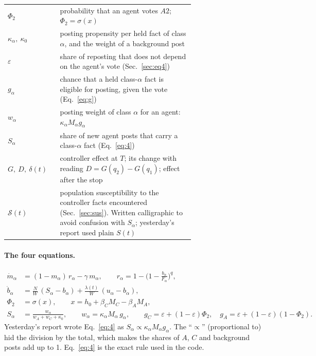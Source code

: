 \documentclass[10pt,a4paper]{article}
\newcommand{\Sus}{\mathcal S}
\begin{document}
\begin{table}[h]
\begin{tabular}{@{}l p{0.72\linewidth}@{}}
$\Phi_2$ & probability that an agent votes $A2$; $\Phi_2=\sigma(x)$\\
$\kappa_\alpha,\ \kappa_0$ & posting propensity per held fact of class $\alpha$, and the weight of a background post\\
$\varepsilon$ & share of reposting that does not depend on the agent's vote (Sec.~\ref{sec:eq4})\\
$g_\alpha$ & chance that a held class-$\alpha$ fact is eligible for posting, given the vote (Eq.~\ref{eq:g})\\
$w_\alpha$ & posting weight of class $\alpha$ for an agent: $\kappa_\alpha M_\alpha g_\alpha$\\
$S_\alpha$ & share of new agent posts that carry a class-$\alpha$ fact (Eq.~\ref{eq:4})\\
$G,\ D,\ \delta(t)$ & controller effect at $T$; its change with reading $D=G(q_2)-G(q_1)$; effect after the stop\\
$\Sus(t)$ & population susceptibility to the controller facts encountered (Sec.~\ref{sec:sus}). Written
calligraphic to avoid confusion with $S_\alpha$; yesterday's report used plain $S(t)$\\\bottomrule
\end{tabular}
\end{table}

\paragraph{The four equations.}
\begin{align}
\dot m_\alpha&=(1-m_\alpha)\,r_\alpha-\gamma\,m_\alpha,\qquad r_\alpha=1-\Big(1-\frac{b_\alpha}{F_\alpha}\Big)^{q},\label{eq:1}\\
\dot b_\alpha&=\frac NW\,(S_\alpha-b_\alpha)+\frac{\lambda(t)}W\,(u_\alpha-b_\alpha),\label{eq:2}\\
\Phi_2&=\sigma(x),\qquad x=h_0+\beta_C M_C-\beta_A M_A,\label{eq:3}\\
S_\alpha&=\frac{w_\alpha}{w_A+w_C+\kappa_0},\qquad w_\alpha=\kappa_\alpha M_\alpha\,g_\alpha,\qquad
g_C=\varepsilon+(1-\varepsilon)\Phi_2,\quad g_A=\varepsilon+(1-\varepsilon)(1-\Phi_2).\label{eq:4}
\end{align}
Yesterday's report wrote Eq.~\eqref{eq:4} as $S_\alpha\propto\kappa_\alpha M_\alpha g_\alpha$. The ``$\propto$''
(proportional to) hid the division by the total, which makes the shares of $A$, $C$ and background posts add up to 1.
Eq.~\eqref{eq:4} is the exact rule used in the code.
\end{document}
